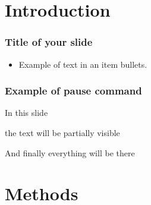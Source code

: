 
\section[Intro]{Introduction}


\begin{frame}
    \frametitle{Title of your slide}
    \begin{itemize}
        \item \small{Example of text in an item bullets.}
    \end{itemize}
    \vfill

\end{frame}



\begin{frame}
    \frametitle{Example of pause command}
    In this slide \pause
    
    the text will be partially visible \pause
    
    And finally everything will be there
\end{frame}

\section[Methods]{Methods}

